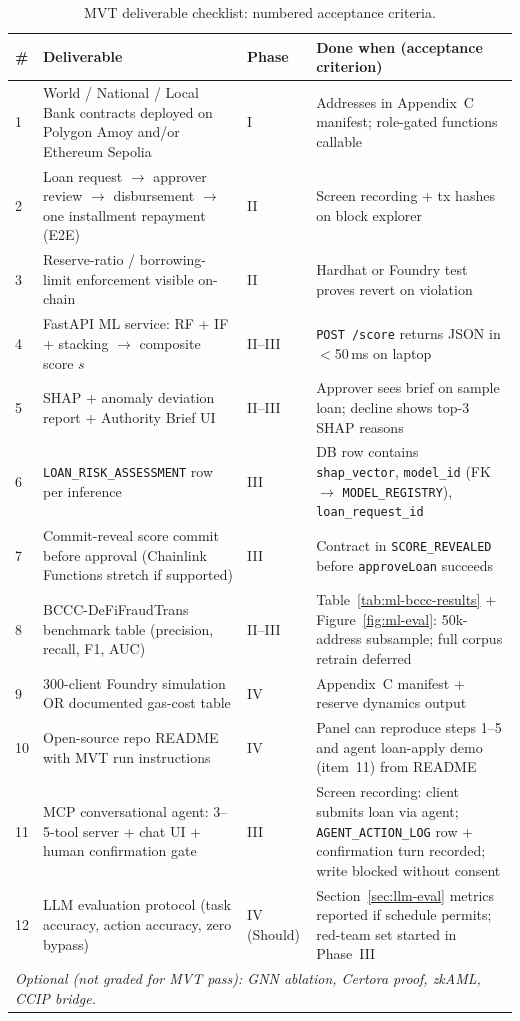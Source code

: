 \documentclass[12pt,a4paper]{report}
\newcommand{\tableheadcolor}{\rowcolor{TableHeadBg}}
\begin{document}
\begin{table}[H]
\centering
\caption[MVT deliverable checklist]{MVT deliverable checklist: numbered acceptance criteria.}
\label{tab:mvt-checklist}
\begin{tabular}{p{0.5cm}p{4.8cm}p{1.6cm}p{6.3cm}}
\toprule
\tableheadcolor
\textbf{\#} & \textbf{Deliverable} & \textbf{Phase} & \textbf{Done when (acceptance criterion)} \\
\midrule
1 & World / National / Local Bank contracts deployed on Polygon Amoy and/or Ethereum Sepolia & I & Addresses in Appendix~C manifest; role-gated functions callable \\
2 & Loan request $\to$ approver review $\to$ disbursement $\to$ one installment repayment (E2E) & II & Screen recording + tx hashes on block explorer \\
3 & Reserve-ratio / borrowing-limit enforcement visible on-chain & II & Hardhat or Foundry test proves revert on violation \\
4 & FastAPI ML service: RF + IF + stacking $\to$ composite score $s$ & II--III & \texttt{POST /score} returns JSON in $<$50\,ms on laptop \\
5 & SHAP + anomaly deviation report + Authority Brief UI & II--III & Approver sees brief on sample loan; decline shows top-3 SHAP reasons \\
6 & \texttt{LOAN\_RISK\_ASSESSMENT} row per inference & III & DB row contains \texttt{shap\_vector}, \texttt{model\_id} (FK $\to$ \texttt{MODEL\_REGISTRY}), \texttt{loan\_request\_id} \\
7 & Commit-reveal score commit before approval (Chainlink Functions stretch if supported) & III & Contract in \texttt{SCORE\_REVEALED} before \texttt{approveLoan} succeeds \\
8 & BCCC-DeFiFraudTrans benchmark table (precision, recall, F1, AUC) & II--III & Table~\ref{tab:ml-bccc-results} + Figure~\ref{fig:ml-eval}: 50k-address subsample; full corpus retrain deferred \\
9 & 300-client Foundry simulation OR documented gas-cost table & IV & Appendix~C manifest + reserve dynamics output \\
10 & Open-source repo README with MVT run instructions & IV & Panel can reproduce steps 1--5 and agent loan-apply demo (item~11) from README \\
11 & MCP conversational agent: 3--5-tool server + chat UI + human confirmation gate & III & Screen recording: client submits loan via agent; \texttt{AGENT\_ACTION\_LOG} row + confirmation turn recorded; write blocked without consent \\
12 & LLM evaluation protocol (task accuracy, action accuracy, zero bypass) & IV (Should) & Section~\ref{sec:llm-eval} metrics reported if schedule permits; red-team set started in Phase~III \\
\multicolumn{4}{l}{\textit{Optional (not graded for MVT pass): GNN ablation, Certora proof, zkAML, CCIP bridge.}} \\
\bottomrule
\end{tabular}
\end{table}
\end{document}
